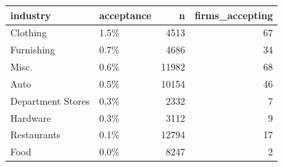 \begin{tabular}[t]{llrr}
\toprule
industry & acceptance & n & firms\_accepting\\
\midrule
Clothing & 1.5\% & 4513 & 67\\
Furnishing & 0.7\% & 4686 & 34\\
Misc. & 0.6\% & 11982 & 68\\
Auto & 0.5\% & 10154 & 46\\
Department Stores & 0.3\% & 2332 & 7\\
\addlinespace
Hardware & 0.3\% & 3112 & 9\\
Restaurants & 0.1\% & 12794 & 17\\
Food & 0.0\% & 8247 & 2\\
\bottomrule
\end{tabular}
